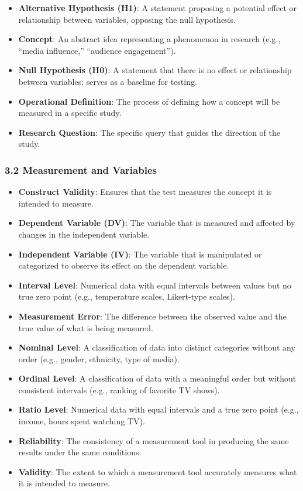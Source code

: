 \documentclass[
]{book}
\providecommand{\tightlist}{%
  \setlength{\itemsep}{0pt}\setlength{\parskip}{0pt}}
\begin{document}
\begin{itemize}
\tightlist
\item
  \textbf{Alternative Hypothesis (H1)}: A statement proposing a potential effect or relationship between variables, opposing the null hypothesis.
\item
  \textbf{Concept}: An abstract idea representing a phenomenon in research (e.g., ``media influence,'' ``audience engagement'').
\item
  \textbf{Null Hypothesis (H0)}: A statement that there is no effect or relationship between variables; serves as a baseline for testing.
\item
  \textbf{Operational Definition}: The process of defining how a concept will be measured in a specific study.
\item
  \textbf{Research Question}: The specific query that guides the direction of the study.
\end{itemize}

\subsubsection*{\texorpdfstring{\textbf{3.2 Measurement and Variables}}{3.2 Measurement and Variables}}\label{measurement-and-variables-1}

\begin{itemize}
\tightlist
\item
  \textbf{Construct Validity}: Ensures that the test measures the concept it is intended to measure.
\item
  \textbf{Dependent Variable (DV)}: The variable that is measured and affected by changes in the independent variable.
\item
  \textbf{Independent Variable (IV)}: The variable that is manipulated or categorized to observe its effect on the dependent variable.
\item
  \textbf{Interval Level}: Numerical data with equal intervals between values but no true zero point (e.g., temperature scales, Likert-type scales).
\item
  \textbf{Measurement Error}: The difference between the observed value and the true value of what is being measured.
\item
  \textbf{Nominal Level}: A classification of data into distinct categories without any order (e.g., gender, ethnicity, type of media).
\item
  \textbf{Ordinal Level}: A classification of data with a meaningful order but without consistent intervals (e.g., ranking of favorite TV shows).
\item
  \textbf{Ratio Level}: Numerical data with equal intervals and a true zero point (e.g., income, hours spent watching TV).
\item
  \textbf{Reliability}: The consistency of a measurement tool in producing the same results under the same conditions.
\item
  \textbf{Validity}: The extent to which a measurement tool accurately measures what it is intended to measure.
\end{itemize}
\end{document}
